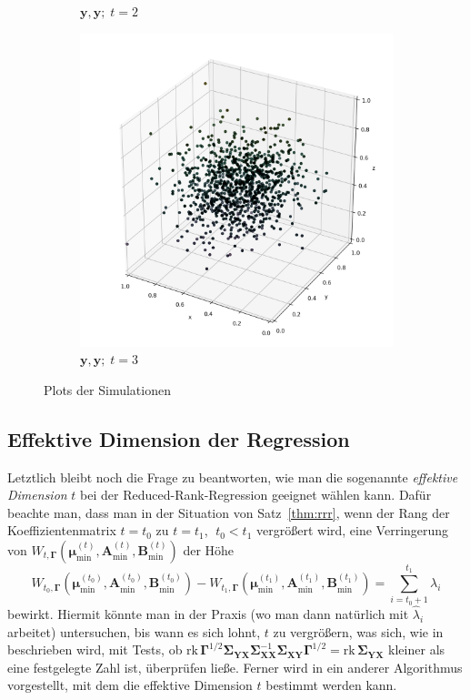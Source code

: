 \documentclass[]{article}
\newcommand{\X}{\mathbf{X}}
\newcommand{\Y}{\mathbf{Y}}
\newcommand{\muu}{\bm{\mu}}
\newcommand{\Ssigma}{\mathbf{\Sigma}}
\newcommand{\rk}{\mathrm{rk}}
\newcommand{\A}{\mathbf{A}}
\newcommand{\B}{\mathbf{B}}
\newcommand{\Ggamma}{\mathbf{\Gamma}}
\newcommand{\yy}{\mathbf{y}}
\begin{document}
\begin{figure}[H]
\begin{subfigure}{0.3\textwidth}
		\caption{$\yy, \yy; \; t=2$}
		\label{fig:5}
	\end{subfigure}\hfil
	\begin{subfigure}{0.3\textwidth}
		\includegraphics[width=\linewidth]{resources/Y_Y_3_simulated.png}
		\caption{$\yy, \yy; \; t=3$}
		\label{fig:6}
	\end{subfigure}
	\caption{Plots der Simulationen}
	\label{fig:images}
\end{figure}


\subsection*{Effektive Dimension der Regression}
Letztlich bleibt noch die Frage zu beantworten, wie man die sogenannte \textit{effektive Dimension} $t$ bei der Reduced-Rank-Regression geeignet wählen kann. Dafür beachte man, dass man in der Situation von Satz~\ref{thm:rrr}, wenn der Rang der Koeffizientenmatrix $t = t_0$ zu $t = t_1$, $\; t_0 < t_1$ vergrößert wird, eine Verringerung von $W_{t, \Ggamma}(\muu^{(t)}_{\min}, \A^{(t)}_{\min}, \B^{(t)}_{\min})$ der Höhe
$$W_{t_0, \Ggamma}(\muu^{(t_0)}_{\min}, \A^{(t_0)}_{\min}, \B^{(t_0)}_{\min}) - W_{t_1, \Ggamma}(\muu^{(t_1)}_{\min}, \A^{(t_1)}_{\min}, \B^{(t_1)}_{\min}) = \sum_{i=t_0+1}^{t_1} \lambda_i$$
bewirkt. Hiermit könnte man in der Praxis (wo man dann natürlich mit $\widehat{\lambda}_i$ arbeitet) untersuchen, bis wann es sich \glqq lohnt\grqq , 
$t$ zu vergrößern, was sich, wie in \cite[Seite 185]{Iz08} beschrieben wird, mit Tests, ob $\rk \, \Ggamma^{1/2} \Ssigma_{\Y\X} \Ssigma_{\X\X}^{-1} \Ssigma_{\X\Y} \Ggamma^{1/2} = \rk \, \Ssigma_{\Y\X}$ kleiner als eine festgelegte Zahl ist, überprüfen ließe. Ferner wird in \cite[Kapitel 6.3.4]{Iz08} ein anderer Algorithmus vorgestellt, mit dem die effektive Dimension $t$ bestimmt werden kann.
\end{document}
